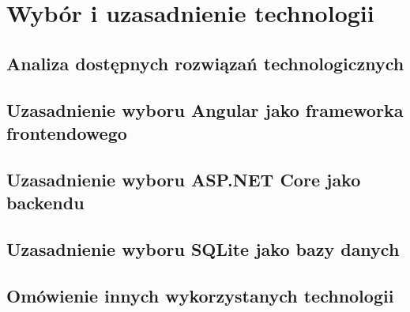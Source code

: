 %


\sloppy

\chapter{Wybór i uzasadnienie technologii}
\label{rozdzial2}

\section{Analiza dostępnych rozwiązań technologicznych}

\section{Uzasadnienie wyboru Angular jako frameworka frontendowego}

\section{Uzasadnienie wyboru ASP.NET Core jako backendu}

\section{Uzasadnienie wyboru SQLite jako bazy danych}

\section{Omówienie innych wykorzystanych technologii}



